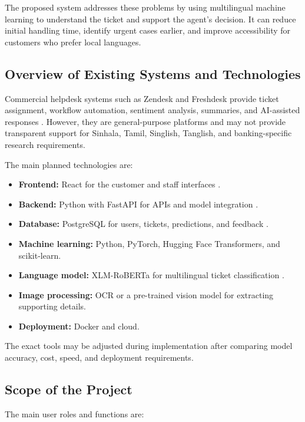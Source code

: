 \documentclass[11pt,a4paper]{article}
\begin{document}
The proposed system addresses these problems by using multilingual machine learning to understand the ticket and support the agent's decision. It can reduce initial handling time, identify urgent cases earlier, and improve accessibility for customers who prefer local languages.

\subsection{Overview of Existing Systems and Technologies}

Commercial helpdesk systems such as Zendesk and Freshdesk provide ticket assignment, workflow automation, sentiment analysis, summaries, and AI-assisted responses \cite{zendesk,freshdesk}. However, they are general-purpose platforms and may not provide transparent support for Sinhala, Tamil, Singlish, Tanglish, and banking-specific research requirements.

The main planned technologies are:

\begin{itemize}
    \item \textbf{Frontend:} React for the customer and staff interfaces \cite{react}.
    \item \textbf{Backend:} Python with FastAPI for APIs and model integration \cite{fastapi}.
    \item \textbf{Database:} PostgreSQL for users, tickets, predictions, and feedback \cite{postgresql}.
    \item \textbf{Machine learning:} Python, PyTorch, Hugging Face Transformers, and scikit-learn.
    \item \textbf{Language model:} XLM-RoBERTa for multilingual ticket classification \cite{xlmr}.
    \item \textbf{Image processing:} OCR or a pre-trained vision model for extracting supporting details.
    \item \textbf{Deployment:} Docker and cloud.
\end{itemize}

The exact tools may be adjusted during implementation after comparing model accuracy, cost, speed, and deployment requirements.

\subsection{Scope of the Project}

The main user roles and functions are:
\end{document}
